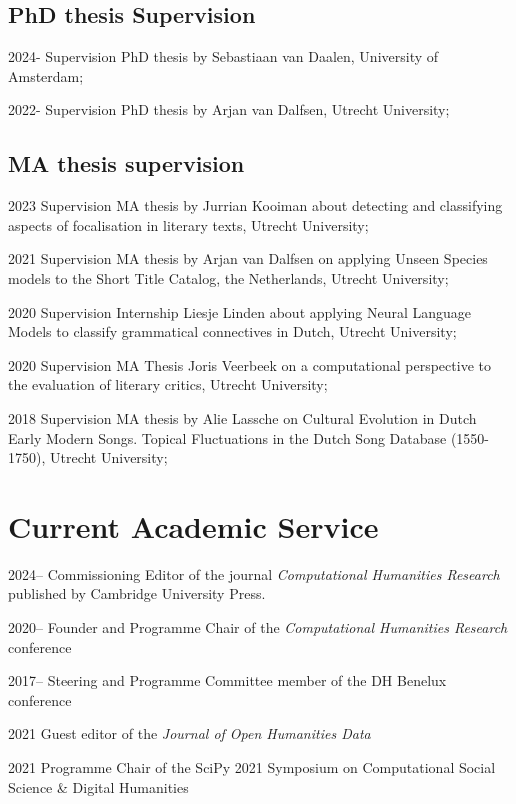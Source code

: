 \documentclass[12pt,letterpaper]{report}
\begin{document}
  \subsection*{PhD thesis Supervision}
\begin{tablist}
  \item[2024-] \tab{}Supervision PhD thesis by Sebastiaan van Daalen, University
    of Amsterdam;
  \item[2022-] \tab{}Supervision PhD thesis by Arjan van Dalfsen, Utrecht
    University;
\end{tablist}
\subsection*{MA thesis supervision}  
\begin{tablist}
  \item[2023] \tab{}Supervision MA thesis by Jurrian Kooiman about detecting and
    classifying aspects of focalisation in literary texts, Utrecht University;
  \item[2021] \tab{}Supervision MA thesis by Arjan van Dalfsen on applying
    Unseen Species models to the Short Title Catalog, the Netherlands, Utrecht University;
  \item[2020] \tab{}Supervision Internship Liesje Linden about applying Neural Language
    Models to classify grammatical connectives in Dutch, Utrecht University;
  \item[2020] \tab{}Supervision MA Thesis Joris Veerbeek on a computational perspective to
    the evaluation of literary critics, Utrecht University;
  \item[2018] \tab{} Supervision MA thesis by Alie Lassche on Cultural Evolution
    in Dutch Early Modern Songs. Topical Fluctuations in the Dutch Song Database
    (1550-1750), Utrecht University;
\end{tablist}

\section*{Current Academic Service}
\begin{tablist}
\item[2024--] \tab{}Commissioning Editor of the journal \emph{Computational
    Humanities Research} published by Cambridge University Press.
\item[2020--] \tab{}Founder and Programme Chair of the \textit{Computational
    Humanities Research} conference
\item[2017--] \tab{}Steering and Programme Committee member of the DH Benelux
  conference
\item[2021] \tab{}Guest editor of the \textit{Journal of Open Humanities Data}
\item[2021] \tab{}Programme Chair of the SciPy 2021 Symposium on Computational
  Social Science \& Digital Humanities
\end{tablist}
\end{document}
